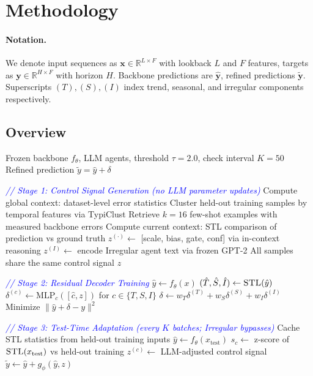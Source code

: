 \section{Methodology}
\paragraph{Notation.} We denote input sequences as $\mathbf{x} \in \mathbb{R}^{L \times F}$ with lookback $L$ and $F$ features, targets as $\mathbf{y} \in \mathbb{R}^{H \times F}$ with horizon $H$. Backbone predictions are $\hat{\mathbf{y}}$, refined predictions $\tilde{\mathbf{y}}$. Superscripts $(T), (S), (I)$ index trend, seasonal, and irregular components respectively.

\subsection{Overview}

\begin{algorithm}[h!]
\small
\caption{CTRL: LLM-Guided Residual Learning}
\label{alg:ctrl}
\begin{algorithmic}[1]
\REQUIRE Frozen backbone $f_\theta$, LLM agents, threshold $\tau{=}2.0$, check interval $K{=}50$
\ENSURE Refined prediction $\tilde{y} = \hat{y} + \delta$

\STATE \textcolor{blue}{\textit{// Stage 1: Control Signal Generation (no LLM parameter updates)}}
\STATE Compute global context: dataset-level error statistics
\STATE Cluster held-out training samples by temporal features via TypiClust
\STATE Retrieve $k{=}16$ few-shot examples with measured backbone errors
\STATE Compute current context: STL comparison of prediction vs ground truth
    \STATE $z^{(\cdot)} \gets$ [scale, bias, gate, conf] via in-context reasoning
\ENDFOR
\STATE $z^{(I)} \gets$ encode Irregular agent text via frozen GPT-2
\STATE All samples share the same control signal $z$ 

\STATE \textcolor{blue}{\textit{// Stage 2: Residual Decoder Training}}
    \STATE $\hat{y} \gets f_\theta(x)$
    \STATE $(\hat{T}, \hat{S}, \hat{I}) \gets \textsc{STL}(\hat{y})$
    \STATE $\delta^{(c)} \gets \text{MLP}_c([\hat{c}, z])$ for $c \in \{T, S, I\}$
    \STATE $\delta \gets w_T \delta^{(T)} + w_S \delta^{(S)} + w_I \delta^{(I)}$
    \STATE Minimize $\|\hat{y} + \delta - y\|^2$
\ENDFOR

\STATE \textcolor{blue}{\textit{// Stage 3: Test-Time Adaptation (every $K$ batches; Irregular bypasses)}}
\STATE Cache STL statistics from held-out training inputs
    \STATE $\hat{y} \gets f_\theta(x_{\text{test}})$
    \STATE $s_c \gets$ z-score of $\textsc{STL}(x_{\text{test}})$ vs held-out training
        \STATE $z^{(c)} \gets$ LLM-adjusted control signal
    \ENDIF
    \STATE $\tilde{y} \gets \hat{y} + g_\phi(\hat{y}, z)$
\ENDFOR
\end{algorithmic}
\end{algorithm}

